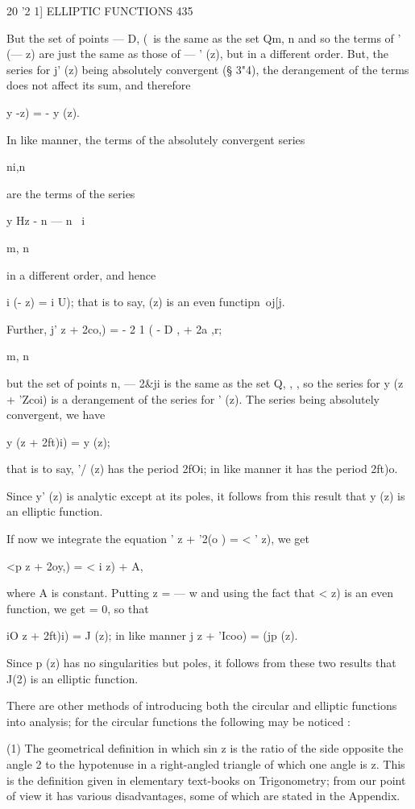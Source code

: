{20 '2 1] ELLIPTIC FUNCTIONS 435

But the set of points — D, (\ is the same as the set Qm, n and so the
terms of ' (— z) are just the same as those of — ' (z), but in a
different order. But, the series for j' (z) being absolutely
convergent (§ 3"4), the derangement of the terms does not affect its
sum, and therefore

 y -z) = - y (z).

In like manner, the terms of the absolutely convergent series

ni,n

are the terms of the series

y Hz - n — n~ i

m, n

in a different order, and hence

i (- z) = i U); that is to say, (z) is an even functipn\ oj[j.

Further, j' z + 2co,) = - 2 1 ( - D , + 2a ,r;

m, n

but the set of points n, — 2\&ji is the same as the set Q, , , so the
series for y (z + 'Zcoi) is a derangement of the series for ' (z). The
series being absolutely convergent, we have

 y (z + 2ft)i) = y (z);

that is to say, '/ (z) has the period 2fOi; in like manner it has the
period 2ft)o.

Since y' (z) is analytic except at its poles, it follows from this
result that y (z) is an elliptic function.

If now we integrate the equation ' z + '2(o ) = < ' z), we get

<p z + 2oy,) = < i z) + A,

where A is constant. Putting z = — w and using the fact that < z) is
an even function, we get = 0, so that

iO z + 2ft)i) = J (z); in like manner j z + 'Icoo) = (jp (z).

Since p (z) has no singularities but poles, it follows from these two
results that J(2) is an elliptic function.

There are other methods of introducing both the circular and elliptic
functions into analysis; for the circular functions the following may
be noticed :

(1) The geometrical definition in which sin z is the ratio of the side
opposite the angle 2 to the hypotenuse in a right-angled triangle of
which one angle is z. This is the definition given in elementary
text-books on Trigonometry; from our point of view it has various
disadvantages, some of which are stated in the Appendix.

}
